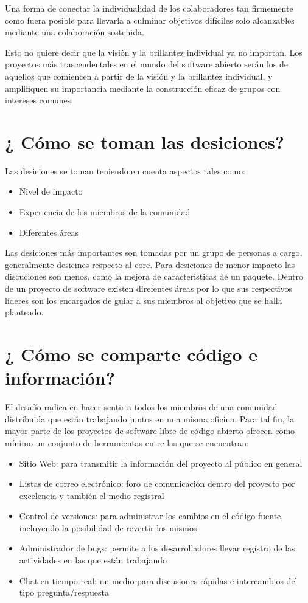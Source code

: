 Una forma de conectar la individualidad de los colaboradores tan firmemente como fuera posible para llevarla a culminar objetivos difíciles solo alcanzables mediante una colaboración sostenida. 

Esto no quiere decir que la visión y la brillantez individual ya no importan. Los proyectos más trascendentales en el mundo del software abierto serán los de aquellos que comiencen a partir de la visión y la brillantez individual, y amplifiquen su importancia mediante la construcción eficaz de grupos con intereses comunes. 


\section{¿ Cómo se toman las desiciones?}

Las desiciones se toman teniendo en cuenta aspectos tales como:
\begin{itemize}
     \item Nivel de impacto
     \item Experiencia de los miembros de la comunidad
     \item Diferentes áreas
\end{itemize}

Las desiciones más importantes son tomadas por un grupo de personas a cargo, generalmente desicines respecto al core. Para desiciones de menor impacto las discuciones son menos, como la mejora de caracteristicas de un paquete.
Dentro de un proyecto de software existen direfentes áreas por lo que sus respectivos líderes son los encargados de guiar a sus miembros al objetivo que se halla planteado.



\section{¿ Cómo se comparte código e información?}

El desafío radica en hacer sentir a todos los miembros de una comunidad distribuida que están trabajando juntos en una misma oficina.
Para tal fin, la mayor parte de los proyectos de software libre de código abierto ofrecen como mínimo un conjunto de herramientas entre las que se encuentran: 

\begin{itemize}
     \item Sitio Web: para transmitir la información del proyecto al público en general
     \item Listas de correo electrónico: foro de comunicación dentro del proyecto por excelencia y también el medio registral
     \item Control de versiones: para administrar los cambios en el código fuente, incluyendo la posibilidad de revertir los mismos
     \item Administrador de bugs: permite a los desarrolladores llevar registro de las actividades en las que están trabajando
     \item Chat en tiempo real: un medio para discusiones rápidas e intercambios del tipo pregunta/respuesta
\end{itemize}



